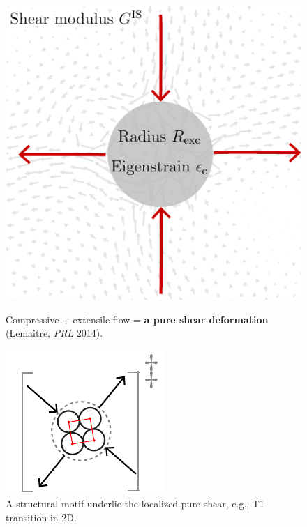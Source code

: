 \begin{frame}[c]
\begin{columns}[T]
\begin{column}[T]{0.4\textwidth}
\begin{figure}[t]
\begin{overprint}
\centering\includegraphics[width=0.85\linewidth]{b.1-exc_pureshear/zoomin-9.pdf}\caption{Compressive + extensile flow = \textbf{a pure shear deformation} (Lemaitre, \textit{PRL} 2014).}

\centering\includegraphics[width=0.85\linewidth]{b.1-exc_pureshear/T1transition.pdf}\caption{A structural motif underlie the localized pure shear, e.g., T1 transition in 2D.}



\end{overprint}
\end{figure}
\end{column}
\end{columns}
\end{frame}
